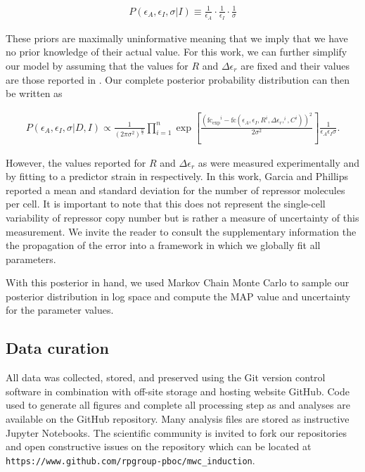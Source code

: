 \begin{align}
P(\epsilon_A, \epsilon_I, \sigma \vert I) \equiv
\frac{1}{\epsilon_A}\cdot\frac{1}{\epsilon_I}\cdot\frac{1}{\sigma}
\end{align}

These priors are maximally uninformative meaning that we imply that we have no
prior knowledge of their actual value. For this work, we can further simplify
our model by assuming that the values for $R$ and $\Delta\epsilon_r$ are fixed
and their values are those reported in \citep{Garcia2011}. Our complete posterior probability distribution can then be written as

\begin{align}
P(\epsilon_A, \epsilon_I, \sigma \vert D, I) \propto
\frac{1}{(2\pi\sigma^2)^\frac{n}{2}}\prod\limits_{i =
1}^n\exp\left[\frac{(\mathrm{fc_{exp}}^i - \mathrm{fc}(\epsilon_A, \epsilon_I,
R^i, \Delta\epsilon_r,^i,
C^i))^2}{2\sigma^2}\right]\frac{1}{\epsilon_A\epsilon_I\sigma}.
\end{align}

However, the values reported for $R$ and $\Delta\epsilon_r$ as
were measured experimentally and by fitting to a predictor strain in  \citep{Garcia2011} respectively. In this work, Garcia and Phillips reported a
mean and standard deviation for the number of repressor molecules per cell. It
is important to note that this does not represent the single-cell variability
of repressor copy number but is rather a measure of uncertainty of this
measurement. We invite the reader to consult the supplementary information the
the propagation of the error into a framework in which we globally fit all
parameters.

With this posterior in hand, we used Markov Chain Monte Carlo to sample our
posterior distribution in log space and compute the MAP value and uncertainty
for the parameter values. 

\subsection*{Data curation}
All data was collected, stored, and preserved using the Git version control
software in combination with off-site storage and hosting website GitHub. Code
used to generate all figures and complete all processing step as and analyses
are available on the GitHub repository. Many analysis files are stored as
instructive Jupyter Notebooks. The scientific community is invited to fork our
repositories and open constructive issues on the repository which can be
located at \texttt{https://www.github.com/rpgroup-pboc/mwc\_induction}.

